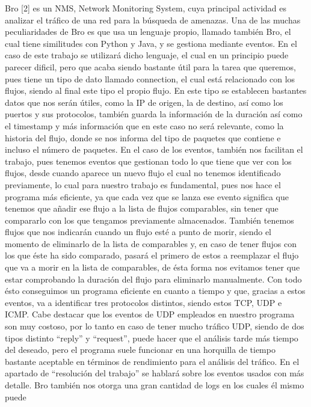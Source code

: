 {{{Bro [2] es un NMS, Network Monitoring System, cuya principal actividad 
es analizar el tráfico de una red para la búsqueda de amenazas. Una de 
las muchas peculiaridades de Bro es que usa un lenguaje propio, llamado 
también Bro, el cual tiene similitudes con Python y Java, y se gestiona 
mediante eventos. En el caso de este trabajo se utilizará dicho lenguaje, 
el cual en un principio puede parecer dificil, pero que acaba siendo 
bastante útil para la tarea que queremos, pues tiene un tipo de dato 
llamado connection, el cual está relacionado con los flujos, siendo al 
final este tipo el propio flujo. En este tipo se establecen bastantes 
datos que nos serán útiles, como la IP de origen, la de destino, así 
como los puertos y sus protocolos, también guarda la información de la 
duración así como el timestamp y más información que en este caso no 
será relevante, como la historia del flujo, donde se nos informa del 
tipo de paquetes que contiene e incluso el número de paquetes.
\intro
En el caso de los eventos, también nos facilitan el trabajo, pues tenemos 
eventos que gestionan todo lo que tiene que ver con los flujos, desde 
cuando aparece un nuevo flujo el cual no tenemos identificado previamente, 
lo cual para nuestro trabajo es fundamental, pues nos hace el programa más 
eficiente, ya que cada vez que se lanza ese evento significa que tenemos 
que añadir ese flujo a la lista de flujos comparables, sin tener que 
compararlo con los que tengamos previamente almacenados. También tenemos 
flujos que nos indicarán cuando un flujo esté a punto de morir, siendo el 
momento de eliminarlo de la lista de comparables y, en caso de tener 
flujos con los que éste ha sido comparado, pasará el primero de estos a 
reemplazar el flujo que va a morir en la lista de comparables, de ésta 
forma nos evitamos tener que estar comprobando la duración del flujo 
para eliminarlo manualmente. Con todo ésto conseguimos un programa eficiente 
en cuanto a tiempo y que, gracias a estos eventos, va a identificar tres 
protocolos distintos, siendo estos TCP, UDP e ICMP. Cabe destacar que los 
eventos de UDP empleados en nuestro programa son muy costoso, por lo tanto 
en caso de tener mucho tráfico UDP, siendo de dos tipos distinto “reply” y 
“request”, puede hacer que el análisis tarde más tiempo del deseado, pero 
el programa suele funcionar en una horquilla de tiempo bastante aceptable 
en términos de rendimiento para el análisis del tráfico. En el apartado de 
“resolución del trabajo” se hablará sobre los eventos usados con más detalle.
\intro
Bro también nos otorga una gran cantidad de logs en los cuales él mismo puede 
}}}
